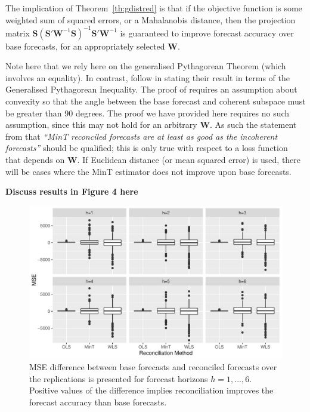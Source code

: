 \documentclass[12pt]{article}
\theoremstyle{definition}
\theoremstyle{property}
\begin{document}
	The implication of Theorem~\ref{th:gdistred} is that if the objective function is some weighted sum of squared errors, or a Mahalanobis distance, then the projection matrix $\bm{S}\left(\bm{S}'\bm{W}^{-1}\bm{S}\right)^{-1}\bm{S}'\bm{W}^{-1}$ is guaranteed to improve forecast accuracy over base forecasts, for an appropriately selected $\bm{W}$.
	
	Note here that we rely here on the generalised Pythagorean Theorem (which involves an equality).  In contrast, \cite{WicEtAl2019} follow \cite{VanErven2015a} in stating their result in terms of the Generalised Pythagorean Inequality.  The proof of \cite{WicEtAl2019} requires an assumption about convexity so that the angle between the base forecast and coherent subspace must be greater than 90 degrees.  The proof we have provided here requires no such assumption, since this may not hold for an arbitrary $\bm{W}$.  As such the statement from \cite{WicEtAl2019} that {\em``MinT reconciled forecasts are at least as good as the incoherent forecasts''} should be qualified; this is only true with respect to a loss function that depends on ${\bm W}$.  If Euclidean distance (or mean squared error) is used, there will be cases where the MinT estimator does not improve upon base forecasts.
	
	{\bf Discuss results in Figure 4 here}
	
	\begin{figure}[H]
		\centering
		\small
		\includegraphics[width = \textwidth]{Figs/OrthVsOblq_Proj_Emp_results.pdf}
		\caption{MSE difference between base forecasts and reconciled forecasts over the replications is presented for forecast horizons $h = 1,...,6$. Positive values of the difference implies reconciliation improves the forecast accuracy than base forecasts.}\label{fig:BaseVSRecon_Fc}
	\end{figure}
	
\end{document}
